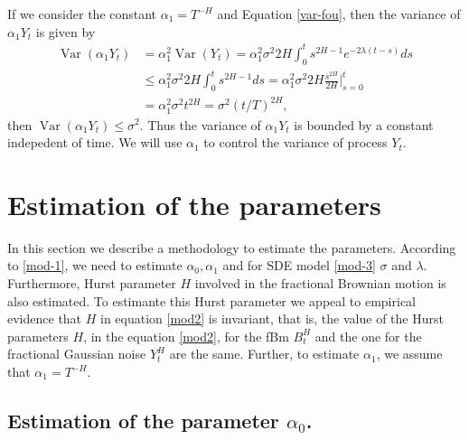 \documentclass[smallextended]{svjour3}
\DeclareMathOperator{\Var}{Var}
\begin{document}
    If we consider the constant $\alpha_1 = T^{-H}$ and  Equation
    \eqref{var-fou}, then the variance of $\alpha_1 Y_t$ is 
    given by
    \begin{equation} \label{var-fou1}
        \begin{aligned}
            \Var(\alpha_1 Y_t)
                & = 
                    \alpha_1 ^2 
                    \Var(Y_t)= \alpha_1^2 \sigma ^ 2 2H  
                    \int_0^t
                        s^{2H - 1} 
                        e^{-2 \lambda (t - s)} 
                    ds
                \\
                & \le 
                    \alpha_1 ^ 2 
                    \sigma^2 2H  
                    \int_0^t
                         s^{2H-1} ds
                     = \alpha_1^2 \sigma^2 2H
                    \frac{s^{2H}}{2H}
                    \Big|_{s=0}^t 
                \\
                & = 
                    \alpha_1 ^ 2 
                    \sigma ^ 2 t ^ {2H} 
                    = \sigma ^ 2 (t / T) ^ {2H},
        \end{aligned}
    \end{equation}
    then $\Var(\alpha_1 Y_t)\le \sigma^2 $. Thus the variance of $\alpha_1 Y_t$ 
    is bounded by a constant indepedent of time. We will use $\alpha_1$ to 
    control the variance of process $Y_t$.

    \section{Estimation of the parameters}
    \label{esti}
        In this section we describe a methodology to estimate the 
    parameters. According to \eqref{mod-1}, we need to estimate 
    $\alpha_0, \alpha_1$ and for SDE model \eqref{mod-3}
    $\sigma$ and $\lambda$. Furthermore, Hurst parameter $H$ involved in the 
    fractional Brownian motion is also estimated. To estimante this Hurst 
    parameter we  appeal to empirical evidence that $H$
    in equation \eqref{mod2} is invariant, that is, the  value of the
    Hurst parameters $H$, in the equation \eqref{mod2}, for the fBm $B_t^H$ and
    the one for the fractional Gaussian noise $Y_t^H$ are the same. Further, to 
    estimate $\alpha_1$, we assume that
    $\alpha_1=T^{-H}$.

    \subsection{Estimation of the parameter $\alpha_0$.}
\end{document}
